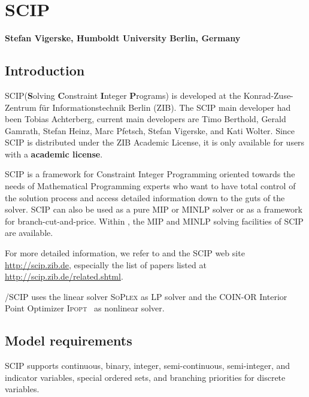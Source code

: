 
\newcommand{\SCIP}{\textsc{SCIP}\xspace}

\chapter{SCIP}
\textbf{Stefan Vigerske, Humboldt University Berlin, Germany}
\vspace{1cm}

\minitoc

\section{Introduction}

\SCIP (\textbf{S}olving \textbf{C}onstraint \textbf{I}nteger \textbf{P}rograms) is developed at the Konrad-Zuse-Zentrum f\"ur Informationstechnik Berlin (ZIB).
The \SCIP main developer had been Tobias Achterberg, current main developers are Timo Berthold, Gerald Gamrath, Stefan Heinz, Marc Pfetsch, Stefan Vigerske, and Kati Wolter.
Since \SCIP is distributed under the ZIB Academic License, it is only available for users with a \textbf{\GAMS academic license}.

\SCIP is a framework for Constraint Integer Programming oriented towards the needs of Mathematical Programming experts who want to have total control of the solution process and access detailed information down to the guts of the solver.
\SCIP can also be used as a pure MIP or MINLP solver or as a framework for branch-cut-and-price.
Within \GAMS, the MIP and MINLP solving facilities of \SCIP are available.

For more detailed information, we refer to \cite{Achterberg2007,Ach09,AchBeKoWo08,Berthold2006,BertholdHeinzVigerske2009,Wolter2006} and the \SCIP web site \url{http://scip.zib.de}, especially the list of papers listed at \url{http://scip.zib.de/related.shtml}.

\GAMS/\SCIP uses the linear solver \textsc{SoPlex} \cite{Wunderling1996} as LP solver and the COIN-OR Interior Point Optimizer \textsc{Ipopt}~\cite{WaBi06} as nonlinear solver.

\section{Model requirements}

\SCIP supports continuous, binary, integer, semi-continuous, semi-integer, and indicator variables, special ordered sets, and branching priorities for discrete variables.

